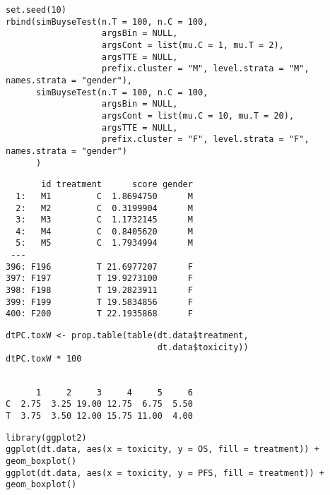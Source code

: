 \documentclass[12pt]{article}
\begin{document}
\lstset{language=r,label= ,caption= ,captionpos=b,numbers=none}
\begin{lstlisting}
set.seed(10)
rbind(simBuyseTest(n.T = 100, n.C = 100,
                   argsBin = NULL,
                   argsCont = list(mu.C = 1, mu.T = 2),
                   argsTTE = NULL,
                   prefix.cluster = "M", level.strata = "M", names.strata = "gender"),
      simBuyseTest(n.T = 100, n.C = 100,
                   argsBin = NULL,
                   argsCont = list(mu.C = 10, mu.T = 20),
                   argsTTE = NULL,
                   prefix.cluster = "F", level.strata = "F", names.strata = "gender")
      )
\end{lstlisting}

\begin{verbatim}
       id treatment      score gender
  1:   M1         C  1.8694750      M
  2:   M2         C  0.3199904      M
  3:   M3         C  1.1732145      M
  4:   M4         C  0.8405620      M
  5:   M5         C  1.7934994      M
 ---                                 
396: F196         T 21.6977207      F
397: F197         T 19.9273100      F
398: F198         T 19.2823911      F
399: F199         T 19.5834856      F
400: F200         T 22.1935868      F
\end{verbatim}


\lstset{language=r,label= ,caption= ,captionpos=b,numbers=none}
\begin{lstlisting}
dtPC.toxW <- prop.table(table(dt.data$treatment,
                              dt.data$toxicity))
dtPC.toxW * 100
\end{lstlisting}

\begin{verbatim}

      1     2     3     4     5     6
C  2.75  3.25 19.00 12.75  6.75  5.50
T  3.75  3.50 12.00 15.75 11.00  4.00
\end{verbatim}


\lstset{language=r,label= ,caption= ,captionpos=b,numbers=none}
\begin{lstlisting}
library(ggplot2)
ggplot(dt.data, aes(x = toxicity, y = OS, fill = treatment)) + geom_boxplot()
ggplot(dt.data, aes(x = toxicity, y = PFS, fill = treatment)) + geom_boxplot()
\end{lstlisting}
\end{document}
